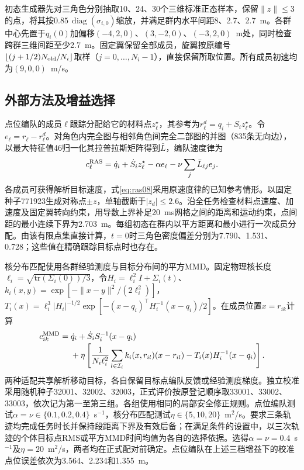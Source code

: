 \documentclass[UTF8,a4paper,11pt,fontset=none]{ctexart}
\newcommand{\diag}{\operatorname{diag}}\newcommand{\col}{\operatorname{col}}
\begin{document}
初态生成器先对三角色分别抽取10、24、30个三维标准正态样本，保留$\|z\|\le3$的点，将其按$0.85\,\diag(\sigma_{i,0})$缩放，并满足群内水平间距8、2.7、2.7~m。各群中心先置于$q_i(0)$加偏移$(-4,2,0)$、$(3,-2,0)$、$(-3,2,0)$~m处，同时检查跨群三维间距至少2.7~m。固定翼保留全部成员，旋翼按原编号$\lfloor(j+1/2)N_{\rm old}/N_i\rfloor$取样（$j=0,\ldots,N_i-1$），直接保留所取位置。所有成员初速均为$(9,0,0)$~m/s。

\subsection{外部方法及增益选择}
点位编队的成员$\ell$跟踪分配给它的材料点$z_\ell^\star$，其参考为$r_\ell^d=q_i+S_i z_\ell^\star$。令$e_\ell=r_\ell-r_\ell^d$。对角色内完全图与相邻角色间完全二部图的并图（835条无向边），以最大特征值46归一化其拉普拉斯矩阵得到$\bar L$，编队速度律为
\begin{equation}
 c_\ell^{\rm RAS}=\dot q_i+\dot S_i z_\ell^\star-\alpha e_\ell-\nu\sum_j\bar L_{\ell j}e_j .
 \label{eq:ras08}
\end{equation}
各成员可获得解析目标速度，式\eqref{eq:ras08}采用原速度律的已知参考情形。以固定种子771923生成对称点$\pm z$，单轴截断于$|z_d|\le2.6$。沿全任务检查材料点速度、加速度及固定翼转向约束，用导数上界补足20~ms网格之间的距离和运动约束，点间距的最小连续下界为2.703~m。每组初态在群内以平方距离和最小进行一次成员分配。由该有限点集直接计算，$t=0$时三角色密度偏差分别为7.790、1.531、0.728；这些值在精确跟踪目标点时也存在。

核分布匹配使用各群经验测度与目标分布间的平方MMD。固定物理核长度$\ell_i=\sqrt{\mathrm{tr}(\Sigma_i(0))/3}$，令$H_i=\ell_i^2 I+\Sigma_i(t)$、$k_i(x,y)=\exp[-\|x-y\|^2/(2\ell_i^2)]$，$T_i(x)=\ell_i^3|H_i|^{-1/2}\exp[-(x-q_i)^\top H_i^{-1}(x-q_i)/2]$。在成员位置$x=r_{ik}$计算
\begin{equation}
\begin{split}
 c_{ik}^{\rm MMD}={}&\dot q_i+\dot S_i S_i^{-1}(x-q_i)\\[-2pt]
 &+\eta\left[\frac{1}{N_i\ell_i^2}\sum_{l\in\mathcal I_i} k_i(x,r_{il})(x-r_{il})
             -T_i(x)H_i^{-1}(x-q_i)\right].
\end{split}\label{eq:mmd19}
\end{equation}
两种适配共享解析移动目标，各自保留目标点编队反馈或经验测度梯度。独立校准采用随机种子32001、32002、32003，正式评价按原登记顺序取33001、33002、33003，依次记为第一至第三组。各组使用相同的局部安全修正规则。点位编队测试$\alpha=\nu\in\{0.1,0.2,0.4\}$~s$^{-1}$，核分布匹配测试$\eta\in\{5,10,20\}$~m$^2$/s。要求三条轨迹均完成任务时长并保持段距离下界及有效后备；在满足条件的设置中，以三次轨迹的个体目标点RMS或平方MMD时间均值为各自的选择依据。选得$\alpha=\nu=0.4$~s$^{-1}$及$\eta=20$~m$^2$/s，两者均在正式配对前确定。点位编队在上述三档增益下的校准点位误差依次为3.564、2.234和1.355~m。
\end{document}
